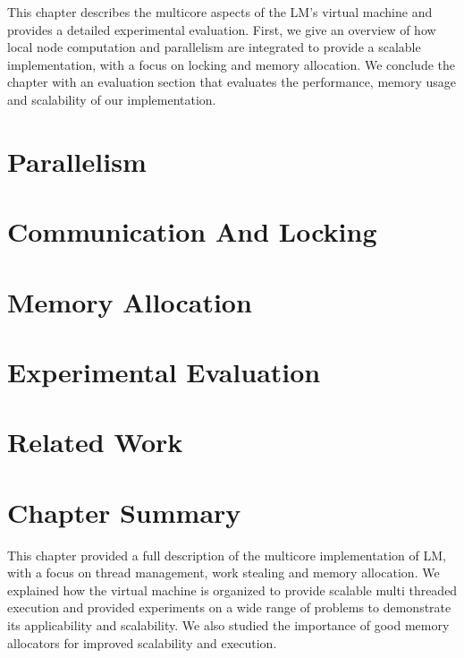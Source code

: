 This chapter describes the multicore aspects of the LM's virtual machine and
provides a detailed experimental evaluation. First, we give an overview of how
local node computation and parallelism are integrated to provide a scalable
implementation, with a focus on locking and memory allocation. We conclude the
chapter with an evaluation section that evaluates the performance, memory usage
and scalability of our implementation.

\section{Parallelism}\label{sec:implementation:parallelism}


\section{Communication And Locking}


\section{Memory Allocation}\label{section:implementation:allocation}


\section{Experimental Evaluation}


\section{Related Work}



\section{Chapter Summary}

This chapter provided a full description of the multicore implementation of LM,
with a focus on thread management, work stealing and memory allocation.  We
explained how the virtual machine is organized to provide scalable multi
threaded execution and provided experiments on a wide range of problems to
demonstrate its applicability and scalability. We also studied the importance of
good memory allocators for improved scalability and execution.
